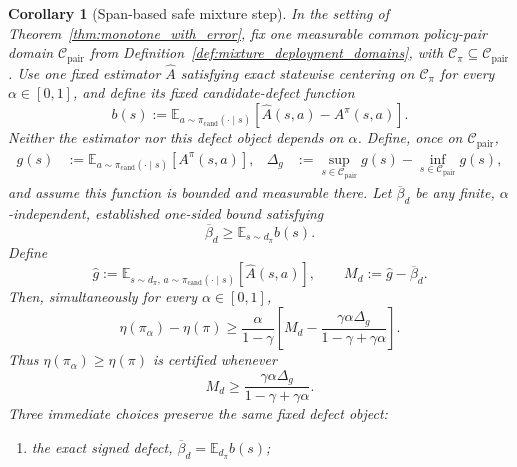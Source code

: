 \documentclass{article}
\theoremstyle{plain}
\newtheorem{corollary}[theorem]{Corollary}
\theoremstyle{definition}
\theoremstyle{remark}
\newcommand{\E}{\mathbb{E}}
\begin{document}
\begin{corollary}[Span-based safe mixture step]
\label{cor:one_step_improvement_condition}
In the setting of Theorem~\ref{thm:monotone_with_error}, fix one measurable
common policy-pair domain $\mathcal C_{\mathrm{pair}}$ from
Definition~\ref{def:mixture_deployment_domains}, with
$\mathcal C_\pi\subseteq\mathcal C_{\mathrm{pair}}$. Use one fixed estimator
$\widehat A$ satisfying exact statewise centering on $\mathcal C_\pi$ for
every $\alpha\in[0,1]$, and define its fixed candidate-defect function
\begin{equation}
b(s):=
\E_{a\sim\pi_{\mathrm{cand}}(\cdot\mid s)}
[\widehat A(s,a)-A^\pi(s,a)].
\label{eq:safe_step_candidate_defect}
\end{equation}
Neither the estimator nor this defect object depends on $\alpha$. Define,
once on $\mathcal C_{\mathrm{pair}}$,
\begin{align}
g(s)
&:=\E_{a\sim\pi_{\mathrm{cand}}(\cdot\mid s)}[A^\pi(s,a)],
&
\Delta_g
&:=\sup_{s\in\mathcal C_{\mathrm{pair}}}g(s)
-\inf_{s\in\mathcal C_{\mathrm{pair}}}g(s),
\label{eq:pair_span_def}
\end{align}
and assume this function is bounded and measurable there. Let
$\overline{\beta}_d$ be any finite, $\alpha$-independent, established
one-sided bound satisfying
\begin{equation}
\overline{\beta}_d\ge \E_{s\sim d_\pi}b(s).
\label{eq:beta_d_bound}
\end{equation}
Define
\begin{equation}
\widehat g
:=\E_{s\sim d_\pi,\,a\sim\pi_{\mathrm{cand}}(\cdot\mid s)}
[\widehat A(s,a)],
\qquad
M_d:=\widehat g-\overline{\beta}_d.
\label{eq:Md_safe_step}
\end{equation}
Then, simultaneously for every $\alpha\in[0,1]$,
\begin{equation}
\eta(\pi_\alpha)-\eta(\pi)
\ge
\frac{\alpha}{1-\gamma}
\left[
M_d-
\frac{\gamma\alpha\Delta_g}{1-\gamma+\gamma\alpha}
\right].
\label{eq:safe_step_interval_bound}
\end{equation}
Thus $\eta(\pi_\alpha)\ge\eta(\pi)$ is certified whenever
\begin{equation}
M_d\ge
\frac{\gamma\alpha\Delta_g}{1-\gamma+\gamma\alpha}.
\label{eq:sufficient_improvement_condition}
\end{equation}
Three immediate choices preserve the same fixed defect object:
\begin{enumerate}
\item the exact signed defect,
$\overline{\beta}_d=\E_{d_\pi}b(s)$;

\end{enumerate}
\end{corollary}
\end{document}
